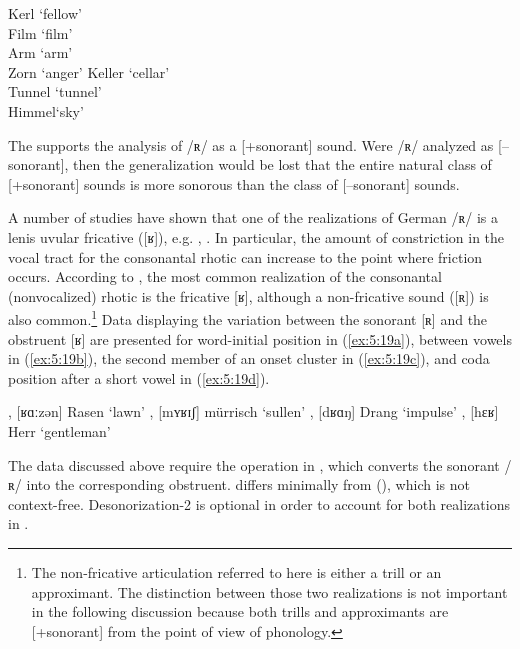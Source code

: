 \ea%
    \label{ex:5:18}
\ea\label{ex:5:18a} 
\relax [kɛʀl]  \tab Kerl \tab ‘fellow’\\
     \relax [fɪlm]  \tab Film \tab ‘film’\\
     \relax [ɑʀm]   \tab Arm  \tab ‘arm’ \\
     \relax [tsɔʀn] \tab Zorn \tab ‘anger’  
\ex \label{ex:5:18b} 
\relax [kɛlɐ]  \tab  Keller \tab ‘cellar’ \\
     \relax [tʊnl̩]\tab  Tunnel \tab  ‘tunnel’\\
     \relax [hɪml̩] \tab  Himmel\tab ‘sky’ 
\z
\z 
{}

The  supports the analysis of /ʀ/ as a [+sonorant] sound. Were /ʀ/ analyzed as [--sonorant], then the generalization would be lost that the entire natural class of [+sonorant] sounds is more sonorous than the class of [--sonorant] sounds.

A number of studies have shown that one of the realizations of German /ʀ/ is a lenis uvular fricative ([ʁ]), e.g. \citet{Ulbrich1972}, \citet[169]{Kohler1977}. In particular, the amount of constriction in the vocal tract for the consonantal rhotic can increase to the point where friction occurs. According to \citet{Ulbrich1972}, the most common realization of the consonantal (nonvocalized) rhotic is the fricative [ʁ], although a non-fricative sound ([ʀ]) is also common.\footnote{{The non-fricative articulation referred to here is either a trill or an approximant. The distinction between those two realizations is not important in the following discussion because both trills and approximants are [+sonorant] from the point of view of phonology.}} Data displaying the variation between the sonorant [ʀ] and the obstruent [ʁ] are presented for word-initial position in (\ref{ex:5:19a}), between vowels in (\ref{ex:5:19b}), the second member of an onset cluster in (\ref{ex:5:19c}), and coda position after a short vowel in (\ref{ex:5:19d}).

\ea%
\label{ex:5:19}
\ea\label{ex:5:19a} \relax [ʀɑːzən], [ʁɑːzən] \tab Rasen    \tab ‘lawn’
\ex\label{ex:5:19b} \relax [mʏʀɪʃ], [mʏʁɪʃ]   \tab mürrisch \tab ‘sullen’
\ex\label{ex:5:19c} \relax [dʀɑŋ], [dʁɑŋ]     \tab Drang    \tab ‘impulse’
\ex\label{ex:5:19d} \relax [hɛʀ], [hɛʁ]       \tab Herr     \tab ‘gentleman’
\z 
\z 

The data discussed above require the operation in , which converts the sonorant /ʀ/ into the corresponding obstruent.  differs minimally from  (), which is not context-free. Desonorization-2 is optional in order to account for both realizations in .


